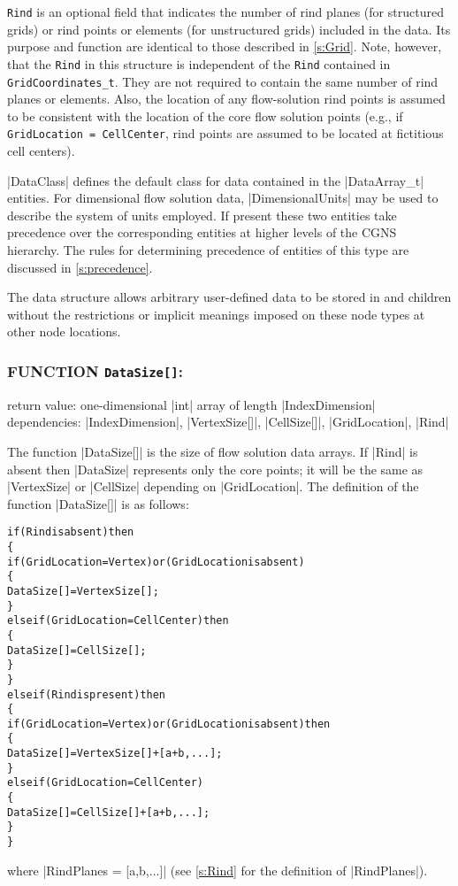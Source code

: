 \texttt{Rind} is an optional field that indicates
the number of rind planes (for structured grids) or rind points or
elements (for unstructured grids) included in the data.
Its purpose and function are identical to those described in
\autoref{s:Grid}.
Note, however, that the \texttt{Rind} in this structure is independent
of the \texttt{Rind} contained in \texttt{GridCoordinates\_t}.
They are not required to contain the same number of rind planes or
elements.
Also, the location of any flow-solution rind points is assumed to be
consistent with the location of the core flow solution points (e.g.,
if \texttt{GridLocation = CellCenter}, rind points are assumed to be
located at fictitious cell centers).

|DataClass| defines the default class for data contained in the
|DataArray_t| entities.  For dimensional flow solution data,
|DimensionalUnits| may be used to describe the system of units employed.
If present these two entities take precedence over the corresponding entities
at higher levels of the CGNS hierarchy.  The rules for determining precedence
of entities of this type are discussed in \autoref{s:precedence}.

The  data structure allows arbitrary
user-defined data to be stored in  and
 children without the restrictions or implicit
meanings imposed on these node types at other node locations.

\subsubsection*{FUNCTION \texttt{DataSize[]}:}

\noindent return value: one-dimensional |int| array of length
                        |IndexDimension| \\
\noindent dependencies: |IndexDimension|, |VertexSize[]|, |CellSize[]|,
                        |GridLocation|, |Rind|

The function |DataSize[]| is the size of flow solution data arrays.
If |Rind| is absent then |DataSize| represents only the core points;
it will be the same as |VertexSize| or |CellSize| depending on
|GridLocation|.
The definition of the function |DataSize[]| is as follows:
\begin{alltt}
  if (Rind is absent) then
    \{
    if (GridLocation = Vertex) or (GridLocation is absent)
      \{
      DataSize[] = VertexSize[] ;
      \}
    else if (GridLocation = CellCenter) then
      \{
      DataSize[] = CellSize[] ;
      \}
    \}
  else if (Rind is present) then
    \{
    if (GridLocation = Vertex) or (GridLocation is absent) then
      \{
      DataSize[] = VertexSize[] + [a + b,...] ;
      \}
    else if (GridLocation = CellCenter)
      \{
      DataSize[] = CellSize[] + [a + b,...] ;
      \}
    \}
\end{alltt}
where |RindPlanes = [a,b,...]| (see \autoref{s:Rind} 
for the definition of |RindPlanes|). 

